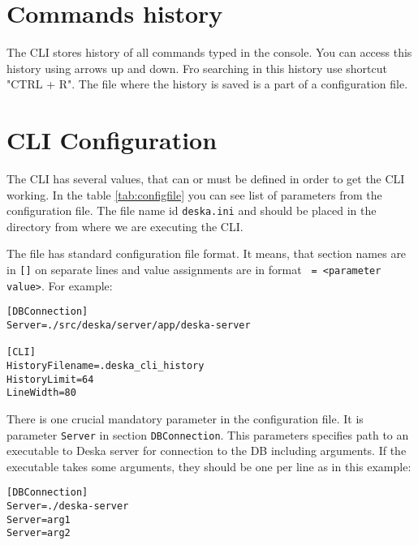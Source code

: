 \documentclass[deska]{subfiles}
\begin{document}
\section{Commands history}

The CLI stores history of all commands typed in the console. You can access this history using arrows up and down. Fro
searching in this history use shortcut "CTRL + R". The file where the history is saved is a part of a configuration
file.

\section{CLI Configuration}

The CLI has several values, that can or must be defined in order to get the CLI working. In the table \ref{tab:configfile}
you can see list of parameters from the configuration file. The file name id {\tt deska.ini} and should be placed in
the directory from where we are executing the CLI.

The file has standard configuration file format. It means, that section names are in {\tt []} on separate lines and
value assignments are in format {\tt <parameter name> = <parameter value>}. For example:
\begin{verbatim}
[DBConnection]
Server=./src/deska/server/app/deska-server

[CLI]
HistoryFilename=.deska_cli_history
HistoryLimit=64
LineWidth=80
\end{verbatim}

\label{sec:cli-connection-setup}
There is one crucial mandatory parameter in the configuration file. It is parameter {\tt Server} in section
{\tt DBConnection}. This parameters specifies path to an executable to Deska server for connection to the DB including
arguments. If the executable takes some arguments, they should be one per line as in this example:
\begin{verbatim}
[DBConnection]
Server=./deska-server
Server=arg1
Server=arg2
\end{verbatim}
\end{document}
